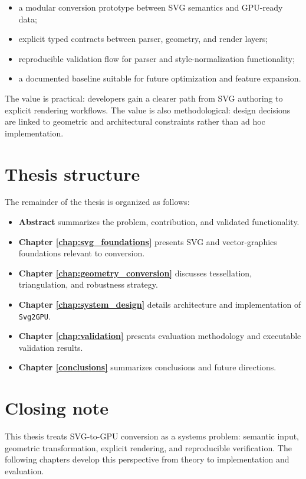 \begin{itemize}
\item a modular conversion prototype between SVG semantics and GPU-ready data;
\item explicit typed contracts between parser, geometry, and render layers;
\item reproducible validation flow for parser and style-normalization functionality;
\item a documented baseline suitable for future optimization and feature expansion.
\end{itemize}

The value is practical: developers gain a clearer path from SVG authoring to explicit rendering workflows.
The value is also methodological: design decisions are linked to geometric and architectural constraints rather than ad hoc implementation.

\section{Thesis structure}

The remainder of the thesis is organized as follows:

\begin{itemize}
\item \textbf{Abstract} summarizes the problem, contribution, and validated functionality.
\item \textbf{Chapter \ref{chap:svg_foundations}} presents SVG and vector-graphics foundations relevant to conversion.
\item \textbf{Chapter \ref{chap:geometry_conversion}} discusses tessellation, triangulation, and robustness strategy.
\item \textbf{Chapter \ref{chap:system_design}} details architecture and implementation of \texttt{Svg2GPU}.
\item \textbf{Chapter \ref{chap:validation}} presents evaluation methodology and executable validation results.
\item \textbf{Chapter \ref{conclusions}} summarizes conclusions and future directions.
\end{itemize}

\section{Closing note}

This thesis treats SVG-to-GPU conversion as a systems problem: semantic input, geometric transformation, explicit rendering, and reproducible verification.
The following chapters develop this perspective from theory to implementation and evaluation.
